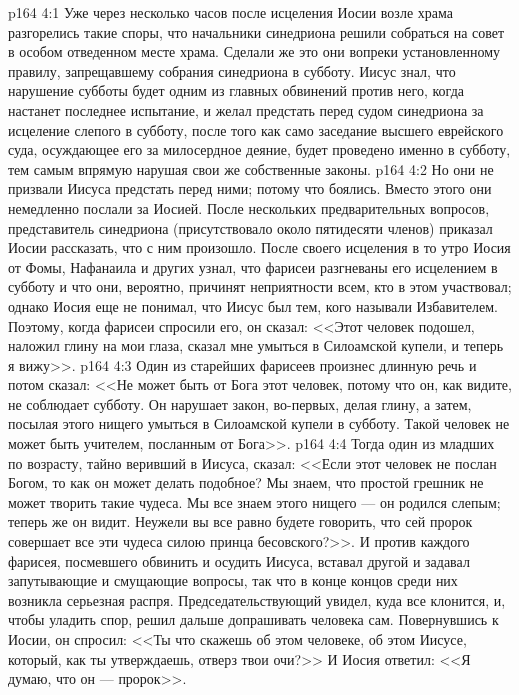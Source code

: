 \vs p164 4:1 Уже через несколько часов после исцеления Иосии возле храма разгорелись такие споры, что начальники синедриона решили собраться на совет в особом отведенном месте храма. Сделали же это они вопреки установленному правилу, запрещавшему собрания синедриона в субботу. Иисус знал, что нарушение субботы будет одним из главных обвинений против него, когда настанет последнее испытание, и желал предстать перед судом синедриона за исцеление слепого в субботу, после того как само заседание высшего еврейского суда, осуждающее его за милосердное деяние, будет проведено именно в субботу, тем самым впрямую нарушая свои же собственные законы.
\vs p164 4:2 Но они не призвали Иисуса предстать перед ними; потому что боялись. Вместо этого они немедленно послали за Иосией. После нескольких предварительных вопросов, представитель синедриона (присутствовало около пятидесяти членов) приказал Иосии рассказать, что с ним произошло. После своего исцеления в то утро Иосия от Фомы, Нафанаила и других узнал, что фарисеи разгневаны его исцелением в субботу и что они, вероятно, причинят неприятности всем, кто в этом участвовал; однако Иосия еще не понимал, что Иисус был тем, кого называли Избавителем. Поэтому, когда фарисеи спросили его, он сказал: <<Этот человек подошел, наложил глину на мои глаза, сказал мне умыться в Силоамской купели, и теперь я вижу>>.
\vs p164 4:3 Один из старейших фарисеев произнес длинную речь и потом сказал: <<Не может быть от Бога этот человек, потому что он, как видите, не соблюдает субботу. Он нарушает закон, во\hyp{}первых, делая глину, а затем, посылая этого нищего умыться в Силоамской купели в субботу. Такой человек не может быть учителем, посланным от Бога>>.
\vs p164 4:4 Тогда один из младших по возрасту, тайно веривший в Иисуса, сказал: <<Если этот человек не послан Богом, то как он может делать подобное? Мы знаем, что простой грешник не может творить такие чудеса. Мы все знаем этого нищего --- он родился слепым; теперь же он видит. Неужели вы все равно будете говорить, что сей пророк совершает все эти чудеса силою принца бесовского?>>. И против каждого фарисея, посмевшего обвинить и осудить Иисуса, вставал другой и задавал запутывающие и смущающие вопросы, так что в конце концов среди них возникла серьезная распря. Председательствующий увидел, куда все клонится, и, чтобы уладить спор, решил дальше допрашивать человека сам. Повернувшись к Иосии, он спросил: <<Ты что скажешь об этом человеке, об этом Иисусе, который, как ты утверждаешь, отверз твои очи?>> И Иосия ответил: <<Я думаю, что он --- пророк>>.
